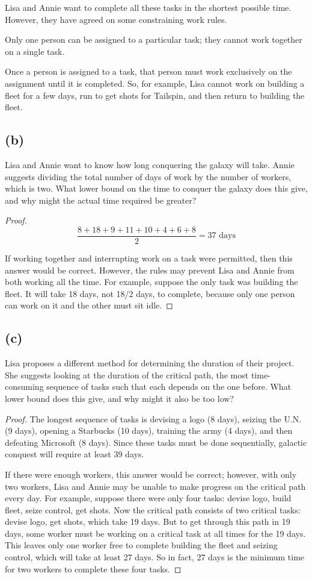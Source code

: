 \documentclass[14pt]{extarticle}
\begin{document}
Lisa and Annie want to complete all these tasks in the shortest possible time. However, they have agreed on some constraining work rules.

Only one person can be assigned to a particular task; they cannot work together on a single task.

Once a person is assigned to a task, that person must work exclusively on the assignment until it is completed. So, for example, Lisa cannot work on building a fleet for a few days, run to get shots for Tailspin, and then return to building the fleet.

\subsection{(b)}
Lisa and Annie want to know how long conquering the galaxy will take. Annie suggests dividing the total number of days of work by the number of workers, which is two. What lower bound on the time to conquer the galaxy does this give, and why might the actual time required be greater?
\begin{proof}
$$
\frac{8+18+9+11+10+4+6+8}{2} = 37 \text{ days}
$$

If working together and interrupting work on a task were permitted, then this answer would be correct. However, the rules may prevent Lisa and Annie from both working all the time. For example, suppose the only task was building the fleet. It will take 18 days, not 18/2 days, to complete, because only one person can work on it and the other must sit idle.
\end{proof}

\subsection{(c)}
Lisa proposes a different method for determining the duration of their project. She suggests looking at the duration of the critical path, the most time-consuming sequence of tasks such that each depends on the one before. What lower bound does this give, and why might it also be too low?
\begin{proof}
The longest sequence of tasks is devising a logo (8 days), seizing the U.N. (9 days), opening a Starbucks (10 days), training the army (4 days), and then defeating Microsoft (8 days). Since these tasks must be done sequentially, galactic conquest will require at least 39 days.

If there were enough workers, this answer would be correct; however, with only two workers, Lisa and Annie may be unable to make progress on the critical path every day. For example, suppose
there were only four tasks: devise logo, build fleet, seize control, get shots. Now the critical path consists of two critical tasks: devise logo, get shots, which take 19 days. But to get through this path in 19 days, some worker must be working on a critical task at all times for the 19 days. This leaves only one worker free to complete building the fleet and seizing control, which will take at least 27 days. So in fact, 27 days is the minimum time for two workers to complete these four tasks.
\end{proof}
\end{document}

